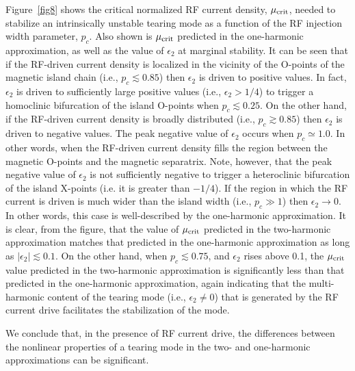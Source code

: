 \documentclass[12pt,prb,aps]{revtex4-1}
\begin{document}
Figure~\ref{fig8} shows the critical normalized RF current density, $\mu_{\rm crit}$, needed to stabilize an intrinsically
unstable tearing mode as a function of the RF injection width parameter, $p_c$. Also shown is  $\mu_{\rm crit}$ predicted in the one-harmonic approximation, as well as the value of $\epsilon_2$ at marginal stability. It can be seen that
if the RF-driven current density is localized in the vicinity of the O-points of the magnetic island chain (i.e., $p_c\lesssim 0.85$) then $\epsilon_2$ is driven to positive values. In fact, $\epsilon_2$ is driven to sufficiently large positive
values (i.e., $\epsilon_2>1/4$) to trigger a homoclinic bifurcation of the  island O-points when  $p_c\lesssim 0.25$. On the other hand, if the RF-driven current density is broadly distributed (i.e., $p_c\gtrsim 0.85$) then $\epsilon_2$ is driven to negative values. The peak negative value of $\epsilon_2$ occurs when $p_c\simeq 1.0$. In other words,
when the RF-driven current density fills the region between the magnetic O-points and the magnetic separatrix. Note, however, that the peak negative value of $\epsilon_2$ is not sufficiently negative to trigger a heteroclinic bifurcation of the
island X-points (i.e. it is greater than $-1/4$). If the region in which the RF current is driven is much wider than the
island width (i.e., $p_c\gg 1$) then $\epsilon_2\rightarrow 0$. In other words, this case is well-described by the one-harmonic approximation. It is clear, from the figure, that the value of $\mu_{\rm crit}$ predicted  in the two-harmonic approximation matches that predicted in the one-harmonic approximation as long as $|\epsilon_2|\lesssim 0.1$. On the other hand, when $p_c\lesssim 0.75$, and $\epsilon_2$ rises above 0.1, the $\mu_{\rm crit}$ value predicted  in the 
two-harmonic approximation is significantly less than that predicted  in the one-harmonic approximation, again indicating that the multi-harmonic content of the tearing mode (i.e., $\epsilon_2\neq 0$) that is
generated by the RF current drive facilitates the stabilization of the mode. 

We conclude that, in the presence of RF current drive, the differences between the nonlinear properties
of a tearing mode in the two- and one-harmonic approximations can be significant.  
 
\end{document}
